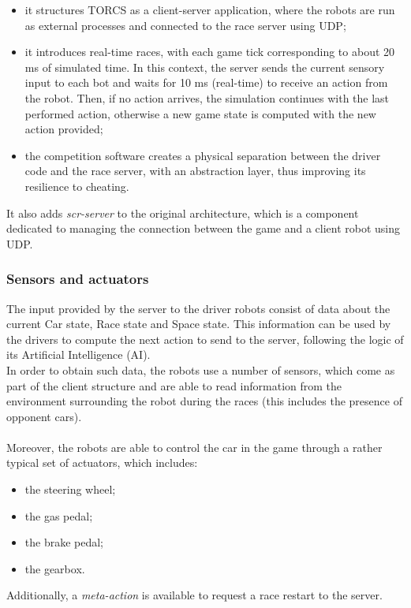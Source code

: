 \begin{itemize}
	\item it structures TORCS as a client-server application, where the robots are run as external processes and connected to the race server using UDP;
	\item it introduces real-time races, with each game tick corresponding to about 20 ms of simulated time. In this context, the server sends the current sensory input to each bot and waits for 10 ms (real-time) to receive an action from the robot. Then, if no action arrives, the simulation continues with the last performed action, otherwise a new game state is computed with the new action provided;
	\item the competition software creates a physical separation between the driver code and the race server, with an abstraction layer, thus improving its resilience to cheating.
\end{itemize}
It also adds \textit{scr-server} to the original architecture, which is a component dedicated to managing the connection between the game and a client robot using UDP.
\subsubsection{Sensors and actuators}\label{sensors-actuators}
The input provided by the server to the driver robots consist of data about the current Car state, Race state and Space state. This information can be used by the drivers to compute the next action to send to the server, following the logic of its Artificial Intelligence (AI). \\
In order to obtain such data, the robots use a number of sensors, which come as part of the client structure and are able to read information from the environment surrounding the robot during the races (this includes the presence of opponent cars). \\ \\
Moreover, the robots are able to control the car in the game through a rather typical set of actuators, which includes:
\begin{itemize}
	\item the steering wheel;
	\item the gas pedal;
	\item the brake pedal;
	\item the gearbox.
\end{itemize}
Additionally, a \textit{meta-action} is available to request a race restart to the server.